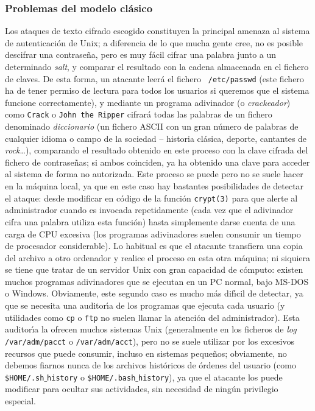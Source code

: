 \subsubsection{Problemas del modelo cl\'asico}
Los ataques de texto cifrado escogido constituyen la principal amenaza al 
sistema de 
autenticaci\'on de Unix; a diferencia de lo que mucha gente cree, no es posible 
descifrar una contrase\~na, pero es muy f\'acil cifrar una palabra junto a un
determinado {\it salt}, y comparar el resultado con la cadena almacenada en el 
fichero de claves. De esta forma, un atacante leer\'a el fichero {\tt 
/etc/passwd} (este fichero ha de tener permiso de lectura para todos los 
usuarios si queremos que el sistema funcione correctamente), y mediante un 
programa adivinador (o {\it crackeador}) como {\tt Crack} o {\tt John the 
Ripper} cifrar\'a todas 
las palabras de un fichero denominado {\it diccionario} (un fichero ASCII con 
un gran n\'umero de palabras de cualquier idioma o campo de la sociedad -- 
historia cl\'asica, deporte, cantantes de {\it rock}\ldots), comparando el 
resultado obtenido en este proceso con la clave cifrada del fichero de 
contrase\~nas; si ambos coinciden, ya ha obtenido una clave para acceder al 
sistema de forma no autorizada. Este proceso se puede pero no se suele hacer en 
la m\'aquina local, ya que en este caso hay bastantes posibilidades de detectar 
el ataque: desde modificar en c\'odigo de la funci\'on {\tt crypt(3)} para que
alerte al administrador cuando es invocada repetidamente (cada vez que el 
adivinador cifra una palabra utiliza esta funci\'on) hasta simplemente darse 
cuenta de una carga de CPU excesiva (los programas adivinadores suelen consumir 
un tiempo de procesador considerable). Lo habitual es que el atacante transfiera
una copia del archivo a otro ordenador y realice el proceso en esta otra 
m\'aquina; ni siquiera se tiene que tratar de un servidor Unix con gran 
capacidad de c\'omputo: existen muchos programas adivinadores que se ejecutan 
en un PC normal, bajo MS-DOS o Windows. Obviamente, este segundo caso es mucho
m\'as dif\'{\i}cil de detectar, ya que se necesita una auditor\'{\i}a de los
programas que ejecuta cada usuario (y utilidades como {\tt cp} o {\tt ftp} no
suelen llamar la atenci\'on del administrador). Esta auditor\'{\i}a la ofrecen
muchos sistemas Unix (generalmente en los ficheros de {\it log} {\tt 
/var/adm/pacct} o {\tt /var/adm/acct}), pero no se suele utilizar por los 
excesivos recursos que puede consumir, incluso en sistemas peque\~nos; 
obviamente, no debemos fiarnos nunca de los archivos hist\'oricos de \'ordenes 
del usuario (como {\tt \$HOME/.sh$\_$history} o {\tt \$HOME/.bash$\_$history}), 
ya que el atacante los puede modificar para ocultar sus actividades, sin 
necesidad de ning\'un privilegio especial.
